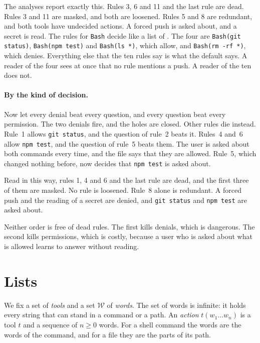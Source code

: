 \documentclass[acmsmall,nonacm,screen]{acmart}
\newcommand{\tool}[2]{\texttt{#1(#2)}}
\newcommand{\rest}{\textup{\texttt{*}}}
\newcommand{\claim}[2]{#2}
\begin{document}
\claim{example}{The analyses report exactly this. Rules 3, 6 and 11 and the last rule are
dead. Rules 3 and 11 are masked, and both are loosened. Rules 5 and 8 are redundant, and both
tools have undecided actions. A forced push is asked about, and a secret is read. The
\exExampleBash{} rules for \texttt{Bash} decide like a list of \exExampleShort{}.} The four
are \tool{Bash}{git status}, \tool{Bash}{npm test} and \tool{Bash}{ls \rest}, which allow,
and \tool{Bash}{rm -rf \rest}, which denies. Everything else that the ten rules say is what
the default says. A reader of the four sees at once that no rule mentions a push. A reader of
the ten does not.

\paragraph{By the kind of decision.} Now let every denial beat every question, and every
question beat every permission. The two denials fire, and the holes are closed. Other rules
die instead. Rule~1 allows \texttt{git status}, and the question of rule~2 beats it. Rules~4
and~6 allow \texttt{npm test}, and the question of rule~5 beats them. The user is asked about
both commands every time, and the file says that they are allowed. Rule~5, which changed
nothing before, now decides that \texttt{npm test} is asked about.

\claim{example-classes}{Read in this way, rules 1, 4 and 6 and the last rule are dead, and
the first three of them are masked. No rule is loosened. Rule~8 alone is redundant. A forced
push and the reading of a secret are denied, and \texttt{git status} and \texttt{npm test}
are asked about.}

Neither order is free of dead rules. The first kills denials, which is dangerous. The second
kills permissions, which is costly, because a user who is asked about what is allowed learns
to answer without reading.

\section{Lists}\label{sec:lists}

We fix a set of \emph{tools} and a set $\mathcal{W}$ of \emph{words}. The set of words is
infinite: it holds every string that can stand in a command or a path. An \emph{action}
$t(w_1 \ldots w_n)$ is a tool $t$ and a sequence of $n \ge 0$ words. For a shell command the
words are the words of the command, and for a file they are the parts of its path.
\end{document}
